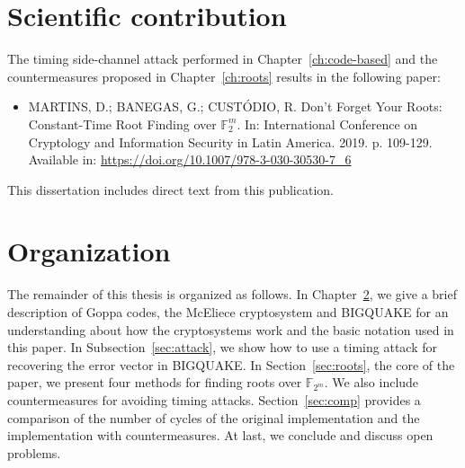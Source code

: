 \section{Scientific contribution}
The timing side-channel attack performed in Chapter~\ref{ch:code-based} and the countermeasures proposed in Chapter~\ref{ch:roots} results in the following paper:

\begin{itemize}
    \item  MARTINS, D.; BANEGAS, G.; CUSTÓDIO, R. Don’t Forget Your Roots: Constant-Time Root Finding over $\mathbb{F}_2^m$. In: International Conference on Cryptology and Information Security in Latin America.  2019. p. 109-129. Available in: \url{https://doi.org/10.1007/978-3-030-30530-7_6}
\end{itemize}

This dissertation includes direct text from this publication.

\section{Organization}
The remainder of this thesis is organized as follows. In Chapter~\ref{}, we give a brief description of Goppa codes, the McEliece cryptosystem and BIGQUAKE for an understanding about how the cryptosystems work and the basic notation used in this paper. In Subsection~\ref{sec:attack}, we show how to use a timing attack for recovering the error vector in BIGQUAKE. In Section~\ref{sec:roots}, the core of the paper, we present four methods for finding roots over $\mathbb{F}_{2^m}$. We also include countermeasures for avoiding timing attacks. Section~\ref{sec:comp} provides a comparison of the number of cycles of the original implementation and the implementation with countermeasures. At last, we conclude and discuss open problems.
















